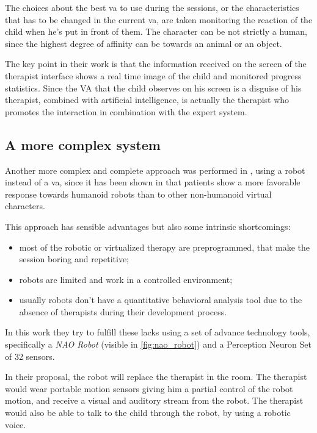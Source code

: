 \documentclass[12pt,journal,draftclsnofoot,onecolumn]{IEEEtran}
\begin{document}
The choices about the best \gls{va} to use during the sessions, or the characteristics that has to be changed in the current \gls{va}, are taken monitoring the reaction of the child when he's put in front of them.
The character can be not strictly a human, since the highest degree of affinity can be towards an animal or an object.

The key point in their work is that the information received on the screen of the therapist interface shows a real time image of the child and monitored progress statistics.
Since the VA that the child observes on his screen is a disguise of his therapist, combined with artificial intelligence, is actually the therapist who promotes the interaction in combination with the expert system.

\subsection{A more complex system}
\label{sec:avatar_complex}

Another more complex and complete approach was performed in \cite{Alahbabi17}, using a robot instead of a \gls{va}, since it has been shown in \cite{Pioggia08} that patients show a more favorable response towards humanoid robots than to other non-humanoid virtual characters.

This approach has sensible advantages but also some intrinsic shortcomings:
\begin{itemize}
	\item most of the robotic or virtualized therapy are preprogrammed, that make the session boring and repetitive;
	\item robots are limited and work in a controlled environment;
	\item usually robots don't have a quantitative behavioral analysis tool due to the absence of therapists during their development process.
\end{itemize}

In this work they try to fulfill these lacks using a set of advance technology tools, specifically a \textit{NAO Robot} (visible in \autoref{fig:nao_robot}) and a Perception Neuron Set of 32 sensors.

In their proposal, the robot will replace the therapist in the room.
The therapist would wear portable motion sensors giving him a partial control of the robot motion, and receive a visual and auditory stream from the robot. The therapist would also be able to talk to the child through the robot, by using a robotic voice.
\end{document}
